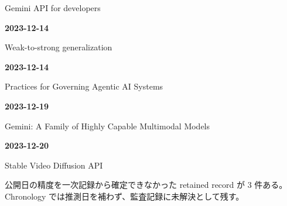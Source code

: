 {\raggedright Gemini API for developers\,\cite{src-a3dead6cff65}\par}
\smallskip
\noindent\textbf{2023-12-14}\par
{\raggedright Weak-to-strong generalization\,\cite{src-b276b4af9d56}\par}
\smallskip
\noindent\textbf{2023-12-14}\par
{\raggedright Practices for Governing Agentic AI Systems\,\cite{src-25adcaa1c831}\par}
\smallskip
\noindent\textbf{2023-12-19}\par
{\raggedright Gemini: A Family of Highly Capable Multimodal Models\,\cite{src-fd9cb9c0061f}\par}
\smallskip
\noindent\textbf{2023-12-20}\par
{\raggedright Stable Video Diffusion API\,\cite{src-2c97fc5583a3}\par}
\smallskip
\medskip
\begin{claimboundary}[日付精度の境界]
公開日の精度を一次記録から確定できなかった retained record が 3 件ある。Chronology では推測日を補わず、監査記録に未解決として残す。
\end{claimboundary}
